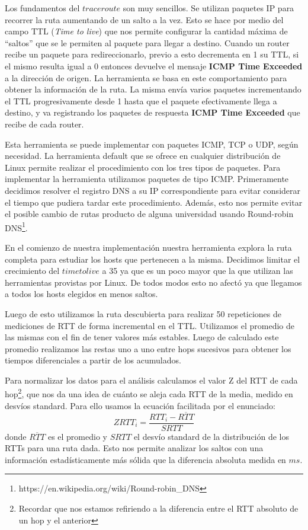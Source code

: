 Los fundamentos del $traceroute$ son muy sencillos. Se utilizan paquetes IP para recorrer la ruta aumentando de un salto a la vez. Esto se hace por medio del campo TTL (\textit{Time to live}) que nos permite configurar la cantidad máxima de ``saltos'' que se le permiten al paquete para llegar a destino. Cuando un router recibe un paquete para redireccionarlo, previo a esto decrementa en 1 su TTL, si el mismo resulta igual a 0 entonces devuelve el mensaje \textbf{ICMP Time Exceeded} a la dirección de origen. La herramienta se basa en este comportamiento para obtener la información de la ruta. La misma envía varios paquetes incrementando el TTL progresivamente desde 1 hasta que el paquete efectivamente llega a destino, y va registrando los paquetes de respuesta \textbf{ICMP Time Exceeded} que recibe de cada router.

Esta herramienta se puede implementar con paquetes ICMP, TCP o UDP, según necesidad. La herramienta default que se ofrece en cualquier distribución de Linux permite realizar el procedimiento con los tres tipos de paquetes. Para implementar la herramienta utilizamos paquetes de tipo ICMP. Primeramente decidimos resolver el registro DNS a su IP correspondiente para evitar considerar el tiempo que pudiera tardar este procedimiento. Además, esto nos permite evitar el posible cambio de rutas producto de alguna universidad usando Round-robin DNS\footnote{https://en.wikipedia.org/wiki/Round-robin\_DNS}.

En el comienzo de nuestra implementación nuestra herramienta explora la ruta completa para estudiar los hosts que pertenecen a la misma. Decidimos limitar el crecimiento del $time to live$ a 35 ya que es un poco mayor que la que utilizan las herramientas provistas por Linux. De todos modos esto no afectó ya que llegamos a todos los hosts elegidos en menos saltos.

Luego de esto utilizamos la ruta descubierta para realizar 50 repeticiones de mediciones de RTT de forma incremental en el TTL. Utilizamos el promedio de las mismas con el fin de tener valores más estables. Luego de calculado este promedio realizamos las restas uno a uno entre hops sucesivos para obtener los tiempos diferenciales a partir de los acumulados.

Para normalizar los datos para el análisis calculamos el valor Z del RTT de cada hop\footnote{Recordar que nos estamos refiriendo a la diferencia entre el RTT absoluto de un hop y el anterior}, que nos da una idea de cuánto se aleja cada RTT de la media, medido en desvíos standard. Para ello usamos la ecuación facilitada por el enunciado: $$ ZRTT_i = \dfrac{RTT_i-\overline{RTT}}{SRTT}$$ donde $\overline{RTT}$ es el promedio y $SRTT$ el desvío standard de la distribución de los RTTs para una ruta dada. Esto nos permite analizar los saltos con una información estadísticamente más sólida que la diferencia absoluta medida en $ms$.

